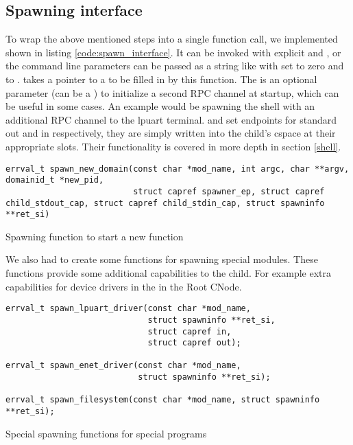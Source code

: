 \subsection{Spawning interface}

To wrap the above mentioned steps into a single function call, we implemented  shown in listing \ref{code:spawn_interface}. It can be invoked with explicit  and , or the command line parameters can be passed as a string like  with  set to zero and  to .  takes a pointer to a  to be filled in by this function. The  is an optional parameter (can be a ) to initialize a second RPC channel at startup, which can be useful in some cases. An example would be spawning the shell with an additional RPC channel to the lpuart terminal.  and  set endpoints for standard out and in respectively, they are simply written into the child's cspace at their appropriate slots. Their functionality is covered in more depth in section \ref{shell}.

\begin{code}
\begin{mdframed}[style=myframe]
\begin{verbatim}
errval_t spawn_new_domain(const char *mod_name, int argc, char **argv, domainid_t *new_pid,
                          struct capref spawner_ep, struct capref child_stdout_cap, struct capref child_stdin_cap, struct spawninfo **ret_si)
\end{verbatim}
\end{mdframed}
\caption{Spawning function to start a new function}
\newline
\label{code:spawn_interface}
\end{code}


We also had to create some functions for spawning special modules. These functions
provide some additional capabilities to the child. For example extra capabilities
for device drivers in the  in the Root CNode.

\begin{code}
\begin{mdframed}[style=myframe]
\begin{verbatim}
errval_t spawn_lpuart_driver(const char *mod_name,
                             struct spawninfo **ret_si,
                             struct capref in,
                             struct capref out);

errval_t spawn_enet_driver(const char *mod_name,
                           struct spawninfo **ret_si);

errval_t spawn_filesystem(const char *mod_name, struct spawninfo **ret_si);
\end{verbatim}
\end{mdframed}
\caption{Special spawning functions for special programs}
\newline
\label{code:spawn_specials}
\end{code}

